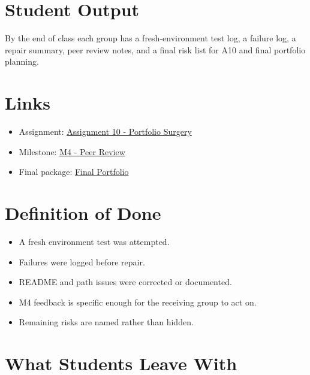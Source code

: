 \documentclass[
  letterpaper,
  DIV=11,
  numbers=noendperiod,
  oneside]{scrreprt}
\providecommand{\tightlist}{%
  \setlength{\itemsep}{0pt}\setlength{\parskip}{0pt}}
\begin{document}
\section*{Student Output}\label{student-output-9}


By the end of class each group has a fresh-environment test log, a
failure log, a repair summary, peer review notes, and a final risk list
for A10 and final portfolio planning.

\section*{Links}\label{links-5}


\begin{itemize}
\tightlist
\item
  Assignment:
  \href{../../assignments/assignment10-portfolio-surgery/README.md}{Assignment
  10 - Portfolio Surgery}
\item
  Milestone: \href{../../milestones/m4-peer-review/README.md}{M4 - Peer
  Review}
\item
  Final package: \href{../../milestones/final-portfolio/README.md}{Final
  Portfolio}
\end{itemize}

\section*{Definition of Done}\label{definition-of-done-7}


\begin{itemize}
\tightlist
\item
  A fresh environment test was attempted.
\item
  Failures were logged before repair.
\item
  README and path issues were corrected or documented.
\item
  M4 feedback is specific enough for the receiving group to act on.
\item
  Remaining risks are named rather than hidden.
\end{itemize}

\section*{What Students Leave With}\label{what-students-leave-with-6}
\end{document}
